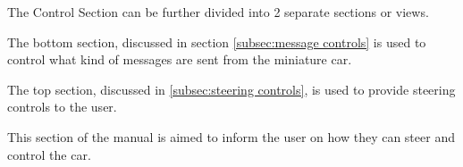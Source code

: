 \documentclass[12pt]{article}
\begin{document}
\hspace{0.02\textwidth} %
\begin{minipage}[t]{0.49\textwidth}
    \vspace{0pt}
    \setlength{\parindent}{20pt}
	The Control Section can be further divided into 2 separate sections or views. \par 
    The bottom section, discussed in section \ref{subsec:message controls} is used to control what kind of messages are sent from the miniature car. \par
    The top section, discussed in \ref{subsec:steering controls}, is used to provide steering controls to the user. \par
    This section of the manual is aimed to inform the user on how they can steer and control the car.
\end{minipage}%

\end{document}
